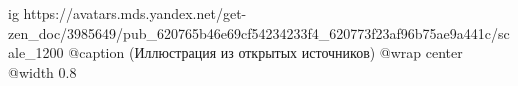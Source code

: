  
 
 
 
 

\ifcmt
  ig https://avatars.mds.yandex.net/get-zen_doc/3985649/pub_620765b46e69cf54234233f4_620773f23af96b75ae9a441c/scale_1200
  @caption (Иллюстрация из открытых источников)
  @wrap center
  @width 0.8
\fi
